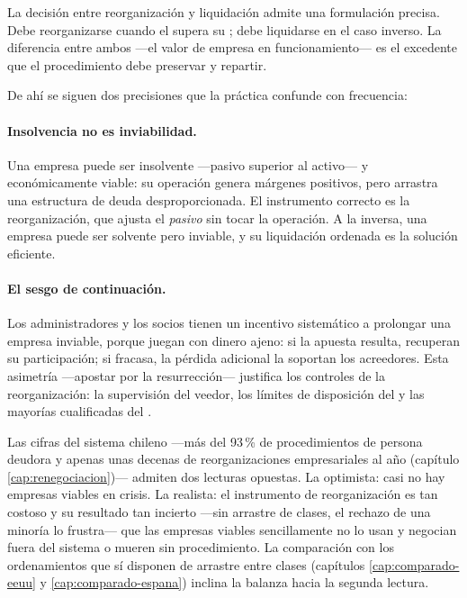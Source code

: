 La decisión entre reorganización y liquidación admite una formulación precisa. Debe reorganizarse
cuando el  supera su ; debe
liquidarse en el caso inverso. La diferencia entre ambos ---el valor de empresa en funcionamiento---
es el excedente que el procedimiento debe preservar y repartir.

De ahí se siguen dos precisiones que la práctica confunde con frecuencia:

\paragraph{Insolvencia no es inviabilidad.} Una empresa puede ser insolvente ---pasivo superior al
activo--- y económicamente viable: su operación genera márgenes positivos, pero arrastra una
estructura de deuda desproporcionada. El instrumento correcto es la reorganización, que ajusta el
\emph{pasivo} sin tocar la operación. A la inversa, una empresa puede ser solvente pero inviable, y
su liquidación ordenada es la solución eficiente.

\paragraph{El sesgo de continuación.} Los administradores y los socios tienen un incentivo
sistemático a prolongar una empresa inviable, porque juegan con dinero ajeno: si la apuesta
resulta, recuperan su participación; si fracasa, la pérdida adicional la soportan los acreedores.
Esta asimetría ---apostar por la resurrección--- justifica los controles de la reorganización: la
supervisión del veedor, los límites de disposición del  y las mayorías cualificadas del
.

\begin{alerta}
Las cifras del sistema chileno ---más del 93\,\% de procedimientos de persona deudora y apenas
unas decenas de reorganizaciones empresariales al año (capítulo \ref{cap:renegociacion})--- admiten
dos lecturas opuestas. La optimista: casi no hay empresas viables en crisis. La realista: el
instrumento de reorganización es tan costoso y su resultado tan incierto ---sin arrastre de clases,
el rechazo de una minoría lo frustra--- que las empresas viables sencillamente no lo usan y
negocian fuera del sistema o mueren sin procedimiento. La comparación con los ordenamientos que sí
disponen de arrastre entre clases (capítulos \ref{cap:comparado-eeuu} y \ref{cap:comparado-espana})
inclina la balanza hacia la segunda lectura.
\end{alerta}

